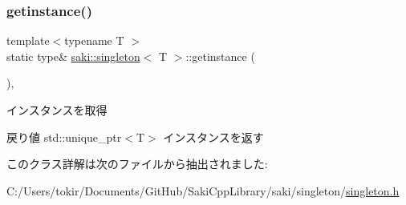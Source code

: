 \subsubsection{\texorpdfstring{getinstance()}{getinstance()}}
{\footnotesize\ttfamily template$<$typename T $>$ \\
static type\& \mbox{\hyperlink{classsaki_1_1singleton}{saki\+::singleton}}$<$ T $>$\+::getinstance (\begin{DoxyParamCaption}{ }\end{DoxyParamCaption})\hspace{0.3cm}{\ttfamily [inline]}, {\ttfamily [static]}}



インスタンスを取得 

\begin{DoxyReturn}{戻り値}
std\+::unique\+\_\+ptr$<$\+T$>$ インスタンスを返す 
\end{DoxyReturn}


このクラス詳解は次のファイルから抽出されました\+:\begin{DoxyCompactItemize}
\item 
C\+:/\+Users/tokir/\+Documents/\+Git\+Hub/\+Saki\+Cpp\+Library/saki/singleton/\mbox{\hyperlink{singleton_8h}{singleton.\+h}}\end{DoxyCompactItemize}
